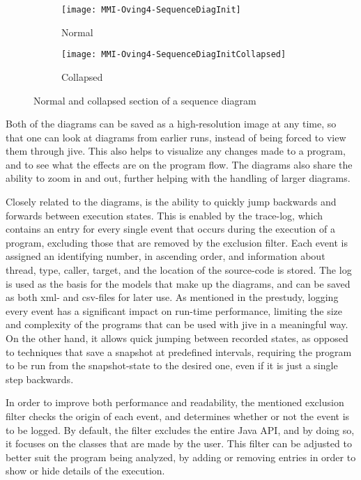 \begin{figure}[H]
	\centering
	\begin{subfigure}{\textwidth}
		\centering
		\texttt{[image: MMI-Oving4-SequenceDiagInit]}
		\caption{Normal}
		\label{fig:seqOving4CollapseA}
	\end{subfigure}
	\begin{subfigure}{\textwidth}
		\centering
		\texttt{[image: MMI-Oving4-SequenceDiagInitCollapsed]}
		\caption{Collapsed}
		\label{fig:seqOving4CollapseB}
	\end{subfigure}
	\caption{Normal and collapsed section of a sequence diagram}
	\label{fig:seqOving4Collapse} 
\end{figure}

Both of the diagrams can be saved as a high-resolution image at any time, so that one can look at diagrams from earlier runs, instead of being forced to view them through \gls{jive}.
This also helps to visualize any changes made to a program, and to see what the effects are on the program flow.
The diagrams also share the ability to zoom in and out, further helping with the handling of larger diagrams.

Closely related to the diagrams, is the ability to quickly jump backwards and forwards between execution states.%
This is enabled by the trace-log, which contains an entry for every single event that occurs during the execution of a program, excluding those that are removed by the exclusion filter.
Each event is assigned an identifying number, in ascending order, and information about thread, type, caller, target, and the location of the source-code is stored.
The log is used as the basis for the models that make up the diagrams, and can be saved as both \gls{xml}- and \gls{csv}-files for later use.
As mentioned in the prestudy, logging every event has a significant impact on run-time performance, limiting the size and complexity of the programs that can be used with \gls{jive} in a meaningful way.
On the other hand, it allows quick jumping between recorded states, as opposed to techniques that save a snapshot at predefined intervals, requiring the program to be run from the snapshot-state to the desired one, even if it is just a single step backwards.

In order to improve both performance and readability, the mentioned exclusion filter checks the origin of each event, and determines whether or not the event is to be logged.
By default, the filter excludes the entire Java API, and by doing so, it focuses on the classes that are made by the user.%
This filter can be adjusted to better suit the program being analyzed, by adding or removing entries in order to show or hide details of the execution.

